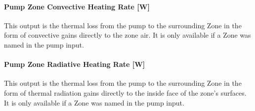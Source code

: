 \paragraph{Pump Zone Convective Heating Rate {[}W{]}}\label{pump-zone-convective-heating-rate-w-4}

This output is the thermal loss from the pump to the surrounding Zone in the form of convective gains directly to the zone air. It is only available if a Zone was named in the pump input.

\paragraph{Pump Zone Radiative Heating Rate {[}W{]}}\label{pump-zone-radiative-heating-rate-w-4}

This output is the thermal loss from the pump to the surrounding Zone in the form of thermal radiation gains directly to the inside face of the zone's surfaces. It is only available if a Zone was named in the pump input.
